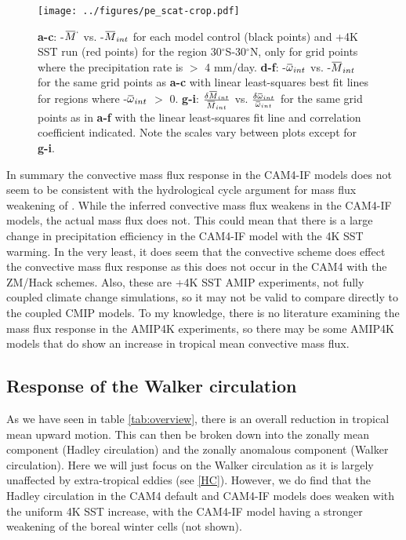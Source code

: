 \documentclass[letterpaper,12pt,titlepage,oneside,final]{book}
\newcommand{\overbar}[1]{\mkern 1.5mu\overline{\mkern-1.5mu#1\mkern-1.5mu}\mkern 1.5mu}
\begin{document}
\begin{figure}[H]
\centering
\noindent\texttt{[image: ../figures/pe\_scat-crop.pdf]}\hfill
\caption{\textbf{a-c}: -$\overbar{M}^{`}$ vs. -$\overbar{M}_{int}$ for each model control (black points) and +4K SST run (red points) for the region 30$^\circ$S-30$^\circ$N, only for grid points where the precipitation rate is $>$ 4 mm/day. \textbf{d-f}: -$\overbar{\omega}_{int}$ vs. -$\overbar{M}_{int}$ for the same grid points as \textbf{a-c} with linear least-squares best fit lines for regions where -$\overbar{\omega}_{int}$ $>$ 0. \textbf{g-i}: $\frac{\delta{\overbar{M}_{int}}}{\overbar{M}_{int}}$ vs. $\frac{\delta{\overbar{\omega}_{int}}}{\overbar{\omega}_{int}}$ for the same grid points as in \textbf{a-f} with the linear least-squares fit line and correlation coefficient indicated. Note the scales vary between plots except for \textbf{g-i}.}
\label{fig:pe}
\end{figure}

In summary the convective mass flux response in the CAM4-IF models does not seem to be consistent with the hydrological cycle argument for mass flux weakening of \citep{held_robust_2006}. While the inferred convective mass flux weakens in the CAM4-IF models, the actual mass flux does not. This could mean that there is a large change in precipitation efficiency in the CAM4-IF model with the 4K SST warming. In the very least, it does seem that the convective scheme does effect the convective mass flux response as this does not occur in the CAM4 with the ZM/Hack schemes. Also, these are +4K SST AMIP experiments, not fully coupled climate change simulations, so it may not be valid to compare directly to the coupled CMIP models. To my knowledge, there is no literature examining the mass flux response in the AMIP4K experiments, so there may be some AMIP4K models that do show an increase in tropical mean convective mass flux.

\subsection{Response of the Walker circulation} 

As we have seen in table \ref{tab:overview}, there is an overall reduction in tropical mean upward motion. This can then be broken down into the zonally mean component (Hadley circulation) and the zonally anomalous component (Walker circulation). Here we will just focus on the Walker circulation as it is largely unaffected by extra-tropical eddies (see \ref{HC}). However, we do find that the Hadley circulation in the CAM4 default and CAM4-IF models does weaken with the uniform 4K SST increase, with the CAM4-IF model having a stronger weakening of the boreal winter cells (not shown).
\end{document}
